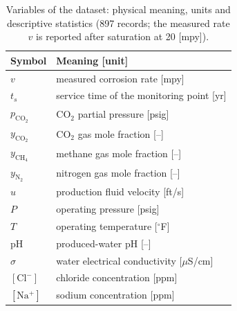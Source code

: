 \begin{table}[htb!]
\centering
\footnotesize
\caption{Variables of the dataset: physical meaning, units and descriptive statistics (897 records; the measured rate $v$ is reported after saturation at 20 [mpy]).}
\label{tab:features}
\begin{tabularx}{0.45\textwidth}{@{}lX@{}}
\toprule
Symbol & Meaning [unit]\\%
\midrule
\midrule
$v$ & measured corrosion rate [mpy] \\%
$t_s$ & service time of the monitoring point [yr] \\%
$p_{\mathrm{CO_2}}$ & CO$_2$ partial pressure [psig] \\%
$y_{\mathrm{CO_2}}$ & CO$_2$ gas mole fraction [--] \\%
$y_{\mathrm{CH_4}}$ & methane gas mole fraction [--] \\%
$y_{\mathrm{N_2}}$ & nitrogen gas mole fraction [--] \\%
$u$ & production fluid velocity [ft/s] \\%
$P$ & operating pressure [psig] \\%
$T$ & operating temperature [$^{\circ}$F] \\%
pH & produced-water pH [--] \\%
$\sigma$ & water electrical conductivity [$\mu$S/cm] \\%
$[\mathrm{Cl^-}]$ & chloride concentration [ppm] \\%
$[\mathrm{Na^+}]$ & sodium concentration [ppm] \\%

\end{tabularx}
\end{table}
